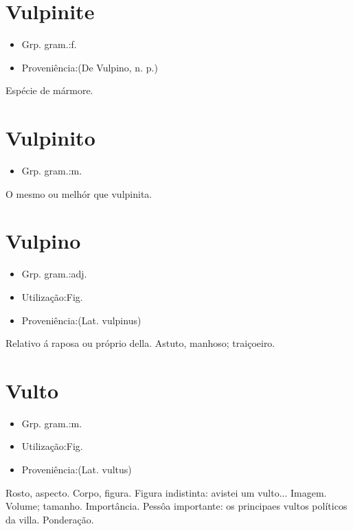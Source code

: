 \documentclass{article}
\begin{document}
\section{Vulpinite}
\begin{itemize}
\item {Grp. gram.:f.}
\end{itemize}
\begin{itemize}
\item {Proveniência:(De \textunderscore Vulpino\textunderscore , n. p.)}
\end{itemize}
Espécie de mármore.
\section{Vulpinito}
\begin{itemize}
\item {Grp. gram.:m.}
\end{itemize}
O mesmo ou melhór que \textunderscore vulpinita\textunderscore .
\section{Vulpino}
\begin{itemize}
\item {Grp. gram.:adj.}
\end{itemize}
\begin{itemize}
\item {Utilização:Fig.}
\end{itemize}
\begin{itemize}
\item {Proveniência:(Lat. \textunderscore vulpinus\textunderscore )}
\end{itemize}
Relativo á raposa ou próprio della.
Astuto, manhoso; traiçoeiro.
\section{Vulto}
\begin{itemize}
\item {Grp. gram.:m.}
\end{itemize}
\begin{itemize}
\item {Utilização:Fig.}
\end{itemize}
\begin{itemize}
\item {Proveniência:(Lat. \textunderscore vultus\textunderscore )}
\end{itemize}
Rosto, aspecto.
Corpo, figura.
Figura indistinta: \textunderscore avistei um vulto...\textunderscore 
Imagem.
Volume; tamanho.
Importância.
Pessôa importante: \textunderscore os principaes vultos políticos da villa\textunderscore .
Ponderação.
\end{document}
